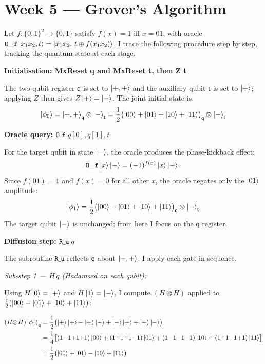 \documentclass[12pt,a4paper]{article}
\begin{document}
\section*{Week 5 --- Grover's Algorithm}

Let $f:\{0,1\}^2\to\{0,1\}$ satisfy $f(x)=1$ iff $x=01$, with oracle
$\mathtt{O\_f}\ket{x_1 x_2,t}=\ket{x_1 x_2,\,t\oplus f(x_1 x_2)}$.
I trace the following procedure step by step, tracking the quantum state at each stage.

\medskip
\textbf{Initialisation: MxReset q and MxReset t, then Z t}

\medskip
The two-qubit register $\mathsf{q}$ is set to $\ket{+,+}$ and the auxiliary qubit $\mathsf{t}$
is set to $\ket{+}$; applying $Z$ then gives $Z\ket{+}=\ket{-}$.
The joint initial state is:
\[
  \ket{\phi_0} = \ket{+,+}_{\mathsf{q}}\otimes\ket{-}_{\mathsf{t}}
  = \frac{1}{2}\bigl(\ket{00}+\ket{01}+\ket{10}+\ket{11}\bigr)_{\mathsf{q}}\otimes\ket{-}_{\mathsf{t}}
\]

\medskip
\textbf{Oracle query: $\mathtt{O\_f}\;q[0],q[1],t$}

\medskip
For the target qubit in state $\ket{-}$, the oracle produces the phase-kickback effect:
\[
  \mathtt{O\_f}\ket{x}\ket{-} = (-1)^{f(x)}\ket{x}\ket{-}.
\]
Since $f(01)=1$ and $f(x)=0$ for all other $x$, the oracle negates only the $\ket{01}$ amplitude:
\[
  \ket{\phi_1}
  = \frac{1}{2}\bigl(\ket{00}-\ket{01}+\ket{10}+\ket{11}\bigr)_{\mathsf{q}}\otimes\ket{-}_{\mathsf{t}}
\]
The target qubit $\ket{-}$ is unchanged; from here I focus on the $\mathsf{q}$ register.

\medskip
\textbf{Diffusion step: $\mathtt{R\_u}\;q$}

\medskip
The subroutine $\mathtt{R\_u}$ reflects $\mathsf{q}$ about $\ket{+,+}$.
I apply each gate in sequence.

\textit{Sub-step 1 --- $H\,q$ (Hadamard on each qubit):}

Using $H\ket{0}=\ket{+}$ and $H\ket{1}=\ket{-}$, I compute $(H\otimes H)$ applied to
$\tfrac{1}{2}(\ket{00}-\ket{01}+\ket{10}+\ket{11})$:

\begin{align*}
(H{\otimes}H)\ket{\phi_1}_{\mathsf{q}}
  &= \frac{1}{2}\bigl(\ket{+}\ket{+}-\ket{+}\ket{-}+\ket{-}\ket{+}+\ket{-}\ket{-}\bigr) \\
  &= \frac{1}{4}\bigl[(1{-}1{+}1{+}1)\ket{00}+(1{+}1{+}1{-}1)\ket{01}
     +(1{-}1{-}1{-}1)\ket{10}+(1{+}1{-}1{+}1)\ket{11}\bigr] \\
  &= \frac{1}{2}\bigl(\ket{00}+\ket{01}-\ket{10}+\ket{11}\bigr)
\end{align*}
\end{document}
